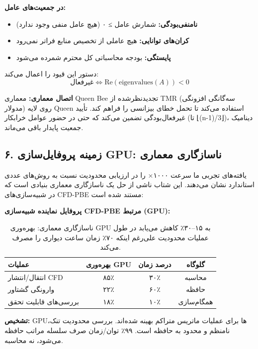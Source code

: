 \documentclass[12pt, a4paper]{article}
\begin{document}
\textbf{در جمعیت‌های عامل:}
\begin{itemize}
\item \textbf{نامنفی‌بودگی:} شمارش عامل ≥ ۰ (هیچ عامل منفی وجود ندارد)
\item \textbf{کران‌های توانایی:} هیچ عاملی از تخصیص منابع فراتر نمی‌رود
\item \textbf{پایستگی:} بودجه محاسباتی کل محترم شمرده می‌شود
\end{itemize}

دستور \textbf{} این قیود را اعمال می‌کند:
\begin{equation}
\text{غیرفعال} \Leftrightarrow \text{Re}(\text{eigenvalues}(A)) < 0
\end{equation}

\textbf{اتصال معماری:} معماری Queen Bee تجدیدنظرشده از TMR (سه‌گانگی افزونگی مدولار) روی لایه Queen استفاده می‌کند تا تحمل خطای بیزانسی را فراهم کند. تأیید غیرفعال‌بودگی تضمین می‌کند که حتی در حضور عوامل خرابکار (تا ⌊(n-1)/3⌋)، دینامیک جمعیت پایدار باقی می‌ماند.

\subsection*{۶. زمینه پروفایل‌سازی GPU: ناسازگاری معماری}

یافته‌های تجربی ما سرعت ۱۰۰۰× را در ارزیابی محدودیت نسبت به روش‌های عددی استاندارد نشان می‌دهند. این شتاب ناشی از حل یک ناسازگاری معماری بنیادی است که در شبیه‌سازی‌های CFD-PBE مستند شده است:

\textbf{پروفایل نماینده شبیه‌سازی CFD-PBE مرتبط (GPU):}

\begin{table}[h]
\centering
\begin{tabular}{lccc}
\toprule
\textbf{عملیات} & \textbf{بهره‌وری GPU} & \textbf{درصد زمان} & \textbf{گلوگاه} \\
\midrule
انتقال/انتشار CFD & ۸۵٪ & ۳۰٪ & محاسبه \\
وارونگی گشتاور & ۲۲٪ & ۶۰٪ & حافظه \\
بررسی‌های قابلیت تحقق & ۱۸٪ & ۱۰٪ & همگام‌سازی \\
\bottomrule
\end{tabular}
\caption{ناسازگاری معماری: بهره‌وری GPU به ۱۵–۳۰٪ کاهش می‌یابد در طول عملیات محدودیت علی‌رغم اینکه ۷۰٪ زمان ساعت دیواری را مصرف می‌کند.}
\end{table}

\textbf{تشخیص:} GPU‌ها برای عملیات ماتریس متراکم بهینه شده‌اند. بررسی محدودیت تنک، نامنظم و محدود به حافظه است. ۹۹٪ توان/زمان صرف سلسله مراتب حافظه می‌شود، نه محاسبه.
\end{document}
